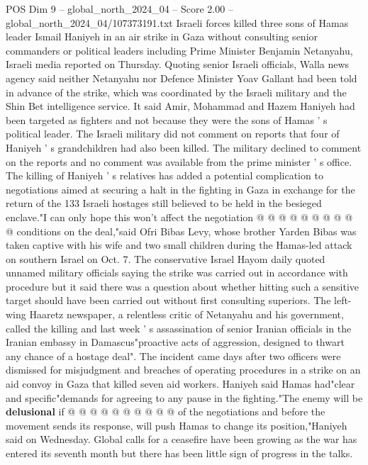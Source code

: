 \begin{textsample}{POS Dim 9 – global\_north\_2024\_04 – Score 2.00 – global\_north\_2024\_04/107373191.txt}  \label{ex:f9_pos_176}
Israeli forces killed three sons of Hamas leader Ismail Haniyeh in an air strike in Gaza without consulting senior commanders or political leaders including Prime Minister Benjamin Netanyahu, Israeli media reported on Thursday.
Quoting senior Israeli officials, Walla news agency said neither Netanyahu nor Defence Minister Yoav Gallant had been told in advance of the strike, which was coordinated by the Israeli military and the Shin Bet intelligence service.
It said Amir, Mohammad and Hazem Haniyeh had been targeted as fighters and not because they were the sons of Hamas ' s political leader.
The Israeli military did not comment on reports that four of Haniyeh ' s grandchildren had also been killed.
The military declined to comment on the reports and no comment was available from the prime minister ' s office.
The killing of Haniyeh ' s relatives has added a potential complication to negotiations aimed at securing a halt in the fighting in Gaza in exchange for the return of the 133 Israeli hostages still believed to be held in the besieged enclave."I can only hope this won't affect the negotiation @ @ @ @ @ @ @ @ @ @ conditions on the deal,"said Ofri Bibas Levy, whose brother Yarden Bibas was taken captive with his wife and two small children during the Hamas-led attack on southern Israel on Oct. 7.
The conservative Israel Hayom daily quoted unnamed military officials saying the strike was carried out in accordance with procedure but it said there was a question about whether hitting such a sensitive target should have been carried out without first consulting superiors.
The left-wing Haaretz newspaper, a relentless critic of Netanyahu and his government, called the killing and last week ' s assassination of senior Iranian officials in the Iranian embassy in Damascus"proactive acts of aggression, designed to thwart any chance of a hostage deal".
The incident came days after two officers were dismissed for misjudgment and breaches of operating procedures in a strike on an aid convoy in Gaza that killed seven aid workers.
Haniyeh said Hamas had"clear and specific"demands for agreeing to any pause in the fighting."The enemy will be \textbf{delusional} if @ @ @ @ @ @ @ @ @ @ of the negotiations and before the movement sends its response, will push Hamas to change its position,"Haniyeh said on Wednesday.
Global calls for a ceasefire have been growing as the war has entered its seventh month but there has been little sign of progress in the talks.

\end{textsample}

